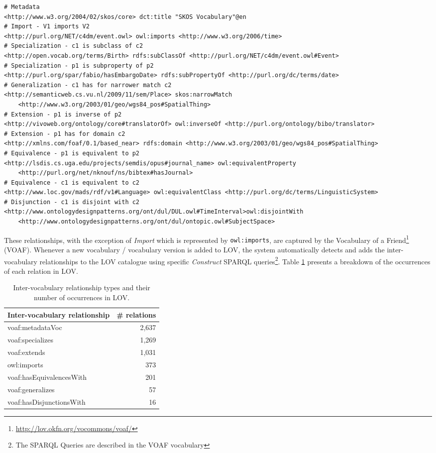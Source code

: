 \documentclass{iosart2c}
\begin{document}
\begin{lstlisting}[float=*,basicstyle=\tiny,label={list:voaf}, language=turtle, caption={Examples of Inter-vocabulary relationships.}]
# Metadata
<http://www.w3.org/2004/02/skos/core> dct:title "SKOS Vocabulary"@en
# Import - V1 imports V2
<http://purl.org/NET/c4dm/event.owl> owl:imports <http://www.w3.org/2006/time>
# Specialization - c1 is subclass of c2
<http://open.vocab.org/terms/Birth> rdfs:subClassOf <http://purl.org/NET/c4dm/event.owl#Event>
# Specialization - p1 is subproperty of p2  
<http://purl.org/spar/fabio/hasEmbargoDate> rdfs:subPropertyOf <http://purl.org/dc/terms/date>
# Generalization - c1 has for narrower match c2 
<http://semanticweb.cs.vu.nl/2009/11/sem/Place> skos:narrowMatch 
    <http://www.w3.org/2003/01/geo/wgs84_pos#SpatialThing>
# Extension - p1 is inverse of p2
<http://vivoweb.org/ontology/core#translatorOf> owl:inverseOf <http://purl.org/ontology/bibo/translator>
# Extension - p1 has for domain c2
<http://xmlns.com/foaf/0.1/based_near> rdfs:domain <http://www.w3.org/2003/01/geo/wgs84_pos#SpatialThing>
# Equivalence - p1 is equivalent to p2
<http://lsdis.cs.uga.edu/projects/semdis/opus#journal_name> owl:equivalentProperty 
    <http://purl.org/net/nknouf/ns/bibtex#hasJournal>
# Equivalence - c1 is equivalent to c2 
<http://www.loc.gov/mads/rdf/v1#Language> owl:equivalentClass <http://purl.org/dc/terms/LinguisticSystem>
# Disjunction - c1 is disjoint with c2
<http://www.ontologydesignpatterns.org/ont/dul/DUL.owl#TimeInterval>owl:disjointWith 
    <http://www.ontologydesignpatterns.org/ont/dul/ontopic.owl#SubjectSpace>
\end{lstlisting}

These relationships, with the exception of \emph{Import} which is represented by {\small\texttt{owl:imports}}, are captured by the Vocabulary of a Friend\footnote{\url{http://lov.okfn.org/vocommons/voaf/}} (VOAF). Whenever a new vocabulary / vocabulary version is added to LOV, the system automatically detects and adds the inter-vocabulary relationships to the LOV catalogue using specific \emph{Construct} SPARQL queries\footnote{The SPARQL Queries are described in the VOAF vocabulary}. Table \ref{tab:voaf} presents a breakdown of the occurrences of each relation in LOV.

\begin{table}[h!tb]
\caption{Inter-vocabulary relationship types and their number of occurrences in LOV.}
\begin{tabular}{lr}
\hline
\textbf{Inter-vocabulary relationship} & \textbf{\# relations} \\ \hline
voaf:metadataVoc & 2,637 \\
voaf:specializes & 1,269 \\
voaf:extends & 1,031 \\
owl:imports & 373 \\
voaf:hasEquivalencesWith & 201 \\
voaf:generalizes & 57 \\
voaf:hasDisjunctionsWith & 16 \\
\hline  
\end{tabular}
\label{tab:voaf}
\end{table}
\end{document}
